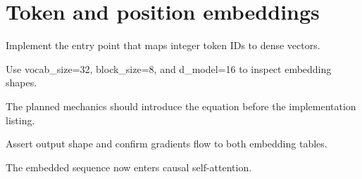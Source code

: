 \section{Token and position embeddings}
\label{sec:ch02-token-and-position-embeddings}

Implement the entry point that maps integer token IDs to dense vectors.



Use vocab\_size=32, block\_size=8, and d\_model=16 to inspect embedding shapes.



The planned mechanics should introduce the equation before the implementation listing.





\begin{checkpointbox}
Assert output shape and confirm gradients flow to both embedding tables.
\end{checkpointbox}

The embedded sequence now enters causal self-attention.
